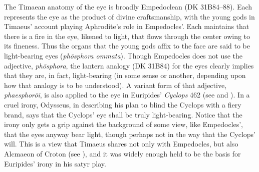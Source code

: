 The Timaean anatomy of the eye is broadly Empedoclean (DK 31B84--88). Each represents the eye as the product of divine craftsmanship, with the young gods in Timaeus' account playing Aphrodite's role in Empedocles'. Each maintains that there is a fire in the eye, likened to light, that flows through the center owing to its fineness. Thus the organs that the young gods affix to the face are said to be light-bearing eyes (\emph{phōsphora ommata}). Though Empedocles does not use the adjective, \emph{phōsphora}, the lantern analogy (DK 31B84) for the eyes clearly implies that they are, in fact, light-bearing (in some sense or another, depending upon how that analogy is to be understood). A variant form of that adjective, \emph{phaesphorōi}, is also applied to the eye in Euripides' \emph{Cyclops} 462 (see \citealt[489-90]{Seaford:1984vb} and \citealt[114]{Johansen:2004dx}). In a cruel irony, Odysseus, in describing his plan to blind the Cyclops with a fiery brand, says that the Cyclops' eye shall be truly light-bearing. Notice that the irony only gets a grip against the background of some view, like Empedocles', that the eyes anyway bear light, though perhaps not in the way that the Cyclops' will. This is a view that Timaeus shares not only with Empedocles, but also Alcmaeon of Croton (see \citealt[11--13]{Beare:1906uq}), and it was widely enough held to be the basis for Euripides' irony in his satyr play.

